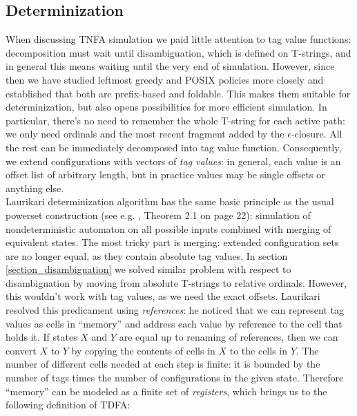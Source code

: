\documentclass{article}
\theoremstyle{definition}
\begin{document}
\begin{multicols}{2}
\section{Determinization}\label{section_determinization}

When discussing TNFA simulation we paid little attention to tag value functions:
decomposition must wait until disambiguation, which is defined on T-strings,
and in general this means waiting until the very end of simulation.
However, since then we have studied leftmost greedy and POSIX policies more closely
and established that both are prefix-based and foldable.
This makes them suitable for determinization, but also opens possibilities for more efficient simulation.
In particular, there's no need to remember the whole T-string for each active path:
we only need ordinals and the most recent fragment added by the $\epsilon$-closure.
All the rest can be immediately decomposed into tag value function.
Consequently, we extend configurations with vectors of \emph{tag values}:
in general, each value is an offset list of arbitrary length,
but in practice values may be single offsets or anything else.
\\

Laurikari determinization algorithm has the same basic principle as the usual powerset construction (see e.g. \cite{HU90}, Theorem 2.1 on page 22):
simulation of nondeterministic automaton on all possible inputs combined with merging of equivalent states.
The most tricky part is merging: extended configuration sets are no longer equal, as they contain absolute tag values.
In section \ref{section_disambiguation} we solved similar problem with respect to disambiguation
by moving from absolute T-strings to relative ordinals.
However, this wouldn't work with tag values, as we need the exact offsets.
Laurikari resolved this predicament using \emph{references}:
he noticed that we can represent tag values as cells in ``memory'' and address each value by reference to the cell that holds it.
If states $X$ and $Y$ are equal up to renaming of references,
then we can convert $X$ to $Y$ by copying the contents of cells in $X$ to the cells in $Y$.
The number of different cells needed at each step is finite:
it is bounded by the number of tags times the number of configurations in the given state.
Therefore ``memory'' can be modeled as a finite set of \emph{registers},
which brings us to the following definition of TDFA:


\end{multicols}
\end{document}
